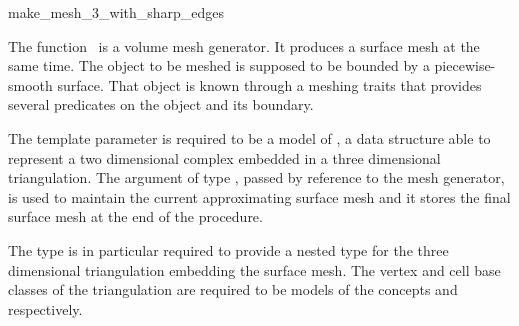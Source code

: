 \ccRefPageBegin


\begin{ccRefFunction}{make_mesh_3_with_sharp_edges}  %


\ccDefinition
  
The function \ccRefName\ is a volume mesh generator. It produces a surface
mesh at the same time. The object to be meshed is supposed to be bounded by
a piecewise-smooth surface. That object is known through a meshing traits
that provides several predicates on the object and its boundary.



\ccParameters

The template parameter  is required to be a model of
, a data structure able to
represent a two dimensional complex embedded in a three dimensional
triangulation. The argument  of type , passed by
reference to the mesh generator, is used to maintain the current
approximating surface mesh and it stores the final surface mesh at the end
of the procedure.

The type  is in particular required to provide a nested type
 for the three dimensional triangulation
embedding the surface mesh.  The vertex and cell base classes of the
triangulation  are required to be models of the
concepts  and 
respectively.


\end{ccRefFunction}
